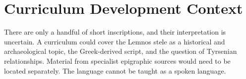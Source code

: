 \documentclass[12pt]{article}
\begin{document}
\section{Curriculum Development Context}
There are only a handful of short inscriptions, and their interpretation is uncertain. A curriculum could cover the Lemnos stele as a historical and archaeological topic, the Greek-derived script, and the question of Tyrsenian relationships. Material from specialist epigraphic sources would need to be located separately. The language cannot be taught as a spoken language.
\end{document}
